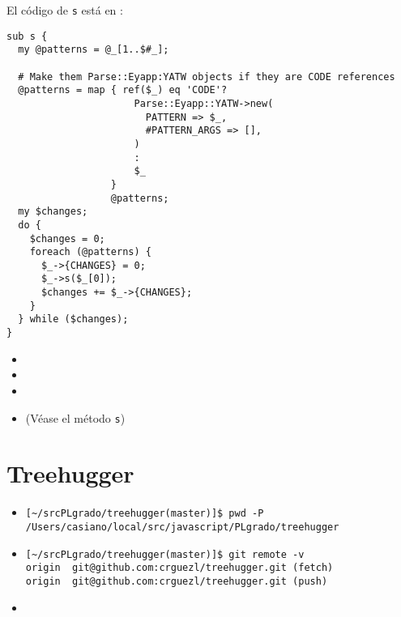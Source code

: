 
El código de \verb|s| está en 
:
\begin{verbatim}
sub s {
  my @patterns = @_[1..$#_];

  # Make them Parse::Eyapp:YATW objects if they are CODE references
  @patterns = map { ref($_) eq 'CODE'? 
                      Parse::Eyapp::YATW->new(
                        PATTERN => $_,
                        #PATTERN_ARGS => [],
                      )
                      :
                      $_
                  } 
                  @patterns;
  my $changes; 
  do { 
    $changes = 0;
    foreach (@patterns) {
      $_->{CHANGES} = 0;
      $_->s($_[0]);
      $changes += $_->{CHANGES};
    }
  } while ($changes);
}
\end{verbatim}


\begin{itemize}
\item
{}
\item
{}
\item
{}
\item
{} (Véase el método \verb|s|)
\end{itemize}

\section{Treehugger}

\begin{itemize}
\item
\begin{verbatim}
[~/srcPLgrado/treehugger(master)]$ pwd -P
/Users/casiano/local/src/javascript/PLgrado/treehugger
\end{verbatim}
\item
\begin{verbatim}
[~/srcPLgrado/treehugger(master)]$ git remote -v
origin  git@github.com:crguezl/treehugger.git (fetch)
origin  git@github.com:crguezl/treehugger.git (push)
\end{verbatim}
\item
{}
\end{itemize}

